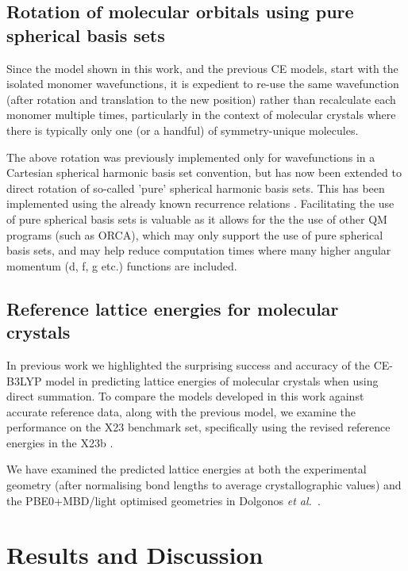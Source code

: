\documentclass[preprint]{iucr}              %
\begin{document}
\subsection{Rotation of molecular orbitals using pure spherical basis sets}

Since the model shown in this work, and the previous CE models, start with
the isolated monomer wavefunctions, it is expedient to re-use the same wavefunction
(after rotation and translation to the new position) rather than recalculate each monomer multiple times, 
particularly in the context of molecular crystals where there is typically only one (or a handful) of 
symmetry-unique molecules.

The above rotation was previously implemented only for wavefunctions in a Cartesian spherical harmonic 
basis set convention, but has now been extended to direct rotation of so-called 'pure' spherical harmonic 
basis sets. This has been implemented using the already known recurrence relations \cite{Ivanic1998}. 
Facilitating the use of pure spherical basis sets is valuable as it allows for the the use of other 
QM programs (such as ORCA), which may only support the use of pure spherical basis sets, and may help reduce 
computation times where many higher angular momentum (d, f, g etc.) functions are included.

\subsection{Reference lattice energies for molecular crystals}
In previous work we highlighted the surprising success and accuracy of the CE-B3LYP model in 
predicting lattice energies of molecular crystals when using direct summation.
To compare the models developed in this work against accurate reference data, along with the
previous model, we examine the performance on the
X23 \cite{Reilly2013} benchmark set, specifically using the revised reference
energies in the X23b \cite{Dolgonos2019}.

We have examined the predicted lattice energies at both the experimental geometry 
(after normalising  bond lengths to average crystallographic values)
and the PBE0+MBD/light optimised geometries in Dolgonos \textit{et al.}~\cite{Dolgonos2019}.

\section{Results and Discussion}
\end{document}
